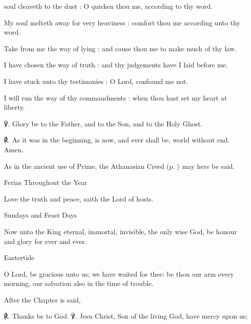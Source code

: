 \begin{multicols}{2}
 soul cleaveth to the dust : O quicken thou me, according to thy word.\par
{}
My soul melteth away for very heaviness : comfort thou me according unto thy word.\par
{}Take from me the way of lying : and cause thou me to make much of thy law.\par
{}I have chosen the way of truth : and thy judgements have I laid before me.\par
{}I have stuck unto thy testimonies : O Lord, confound me not.\par
{}I will run the way of thy commandments : when thou hast set my heart at liberty.\par
℣. Glory be to the Father, and to the Son, and to the Holy Ghost.\par
℟. As it was in the beginning, is now, and ever shall be, world without end. Amen.

\begin{rubric}
    As in the ancient use of Prime, the Athanasian Creed (p. \pageref{Ath}) may here be said.
\end{rubric}


\begin{inhead}
	Ferias Throughout the Year
\end{inhead}\par\noindent
Love the truth and peace, saith the Lord of hosts.

\begin{inhead}
	Sundays and Feast Days
\end{inhead}\par\noindent
Now unto the King eternal, immortal, invisible, the only wise God, be honour and glory for ever and ever.

\begin{inhead}
	Eastertide
\end{inhead}\par\noindent
O Lord, be gracious unto us; we have waited for thee: be thou our arm every morning, our salvation also in the time of trouble.

\begin{rubric}
	After the Chapter is said,
\end{rubric}
℟. Thanks be to God.
℣. Jesu Christ, Son of the living God, have mercy upon us;


\end{multicols}
